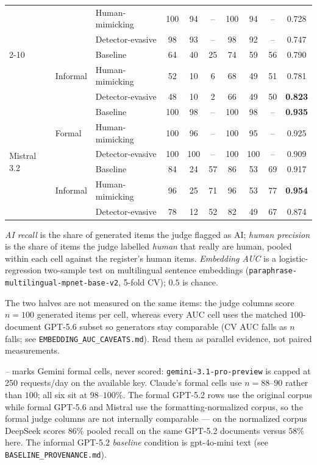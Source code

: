 \begin{table}[htbp]
\begin{tabular}{lll ccc ccc c}
      & & Human-mimicking  & 100 & 94 & -- & 100 & 94 & -- & 0.728 \\
      & & Detector-evasive & 98  & 93 & -- & 98  & 92 & -- & 0.747 \\
    \cmidrule(l){2-10}
      & \multirow{3}{*}{Informal}
        & Baseline         & 64 & 40 & 25 & 74 & 59 & 56 & 0.790 \\
      & & Human-mimicking  & 52 & 10 & 6  & 68 & 49 & 51 & 0.781 \\
      & & Detector-evasive & 48 & 10 & 2  & 66 & 49 & 50 & \textbf{0.823} \\
    \midrule
    \multirow{6}{*}{Mistral 3.2}
      & \multirow{3}{*}{Formal}
        & Baseline         & 100 & 98  & -- & 100 & 98  & -- & \textbf{0.935} \\
      & & Human-mimicking  & 100 & 96  & -- & 100 & 95  & -- & 0.925 \\
      & & Detector-evasive & 100 & 100 & -- & 100 & 100 & -- & 0.909 \\
    \cmidrule(l){2-10}
      & \multirow{3}{*}{Informal}
        & Baseline         & 84 & 24 & 57 & 86 & 53 & 69 & 0.917 \\
      & & Human-mimicking  & 96 & 25 & 71 & 96 & 53 & 77 & \textbf{0.954} \\
      & & Detector-evasive & 78 & 12 & 52 & 82 & 49 & 67 & 0.874 \\
    \bottomrule
  \end{tabular}

  \vspace{0.5em}
  \begin{minipage}{\linewidth}
  \footnotesize
  \emph{AI recall} is the share of generated items the judge flagged as AI;
  \emph{human precision} is the share of items the judge labelled \emph{human} that
  really are human, pooled within each cell against the register's human items.
  \emph{Embedding AUC} is a logistic-regression two-sample test on multilingual
  sentence embeddings (\texttt{paraphrase-multilingual-mpnet-base-v2}, 5-fold CV);
  $0.5$ is chance.

  The two halves are not measured on the same items: the judge columns score $n=100$
  generated items per cell, whereas every AUC cell uses the matched $100$-document
  GPT-5.6 subset so generators stay comparable (CV AUC falls as $n$ falls; see
  \texttt{EMBEDDING\_AUC\_CAVEATS.md}). Read them as parallel evidence, not paired
  measurements.

  \emph{--} marks Gemini formal cells, never scored:
  \texttt{gemini-3.1-pro-preview} is capped at 250 requests/day on the available key.
  Claude's formal cells use $n=88$--$90$ rather than $100$; all six sit at
  $98$--$100\%$. The formal GPT-5.2 rows use the original corpus while formal GPT-5.6
  and Mistral use the formatting-normalized corpus, so the formal judge columns are not
  internally comparable --- on the normalized corpus DeepSeek scores $86\%$ pooled
  recall on the same GPT-5.2 documents versus $58\%$ here. The informal GPT-5.2
  \emph{baseline} condition is gpt-4o-mini text (see \texttt{BASELINE\_PROVENANCE.md}).
  \end{minipage}
\end{table}
